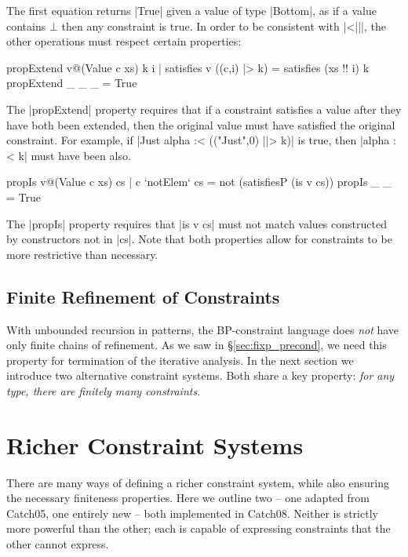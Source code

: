 \documentclass[preprint]{sigplanconf}
\begin{document}
The first equation returns |True| given a value of type |Bottom|, as if a value contains $\bot{}$ then any constraint is true. In order to be consistent with |<|||, the other operations must respect certain properties:

\begin{code}
propExtend  v@(Value c xs) k i
    | satisfies v ((c,i) |> k) = satisfies (xs !! i) k
propExtend _ _ _ = True
\end{code}

\noindent The |propExtend| property requires that if a constraint satisfies a value after they have both been extended, then the original value must have satisfied the original constraint. For example, if |Just alpha :< (("Just",0) ||> k)| is true, then |alpha :< k| must have been also.

\begin{code}
propIs  v@(Value c xs) cs | c `notElem` cs = not (satisfiesP (is v cs))
propIs  _ _ = True
\end{code}

\noindent The |propIs| property requires that |is v cs| must not match values constructed by constructors not in |cs|. Note that both properties allow for constraints to be more restrictive than necessary.

\subsection{Finite Refinement of Constraints}
\label{sec:bounded}

With unbounded recursion in patterns, the BP-constraint language does \textit{not} have only finite chains of refinement. As we saw in \S\ref{sec:fixp_precond}, we need this property for termination of the iterative analysis. In the next section we introduce two alternative constraint systems. Both share a key property: \textit{for any type, there are finitely many constraints}.


\section{Richer Constraint Systems}
\label{sec:constraint}

There are many ways of defining a richer constraint system, while also ensuring the necessary finiteness properties. Here we outline two -- one adapted from Catch05, one entirely new -- both implemented in Catch08. Neither is strictly more powerful than the other; each is capable of expressing constraints that the other cannot express.
\end{document}
